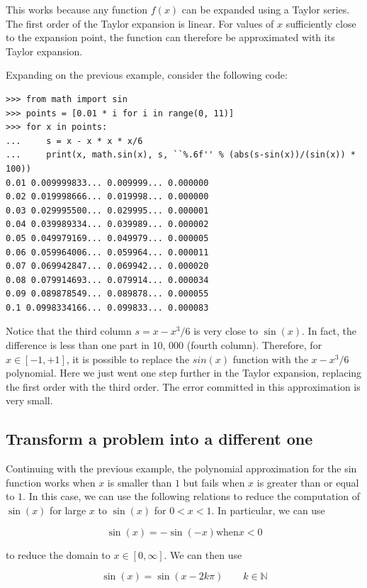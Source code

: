 \documentclass[justified, sixbynine]{tufte-book}
\theoremstyle{plain}%
\newtheorem * {corollary}{Corollary}
\theoremstyle{definition}
\theoremstyle{remark}
\newtheorem * {remark}{Remark}
\newtheorem * {note}{Note}
\begin{document}
\begin{fullwidth}
This works because any function $f(x)$ can be expanded using a Taylor series. The first order of the Taylor expansion is linear. For values of $x$ sufficiently close to the expansion point, the function can therefore be approximated with its Taylor expansion.

Expanding on the previous example, consider the following code:

\begin{lstlisting}
>>> from math import sin
>>> points = [0.01 * i for i in range(0, 11)]
>>> for x in points:
...     s = x - x * x * x/6
...     print(x, math.sin(x), s, ``%.6f'' % (abs(s-sin(x))/(sin(x)) * 100))
0.01 0.009999833... 0.009999... 0.000000
0.02 0.019998666... 0.019998... 0.000000
0.03 0.029995500... 0.029995... 0.000001
0.04 0.039989334... 0.039989... 0.000002
0.05 0.049979169... 0.049979... 0.000005
0.06 0.059964006... 0.059964... 0.000011
0.07 0.069942847... 0.069942... 0.000020
0.08 0.079914693... 0.079914... 0.000034
0.09 0.089878549... 0.089878... 0.000055
0.1 0.0998334166... 0.099833... 0.000083
\end{lstlisting}

Notice that the third column $s = x - x^3/6$ is very close to $\sin(x)$. In fact, the difference is less than one part in 10, 000 (fourth column). Therefore, for $x \in [-1, +1]$, it is possible to replace the $sin(x)$ function with the $x-x^3/6$ polynomial. Here we just went one step further in the Taylor expansion, replacing the first order with the third order. The error committed in this approximation is very small.


\goodbreak\subsection{Transform a problem into a different one}

Continuing with the previous example, the polynomial approximation for the sin function works when $x$ is smaller than $1$ but fails when $x$ is greater than or equal to $1$. In this case, we can use the following relations to reduce the computation of $\sin(x)$ for large $x$ to $\sin(x)$ for $0<x<1$. In particular, we can use

\begin{equation}
\sin(x) = -\sin(-x) \textrm{when} x < 0
\end{equation}

to reduce the domain to $x \in [0, \infty]$. We can then use

\begin{equation}
\sin(x) = \sin(x - 2k\pi) \qquad k\in \mathbb{N}
\end{equation}


\end{fullwidth}
\end{document}
